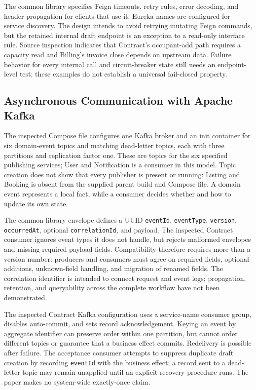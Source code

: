 The common library specifies Feign timeouts, retry rules, error decoding, and header propagation for clients that use it. Eureka names are configured for service discovery. The design intends to avoid retrying mutating Feign commands, but the retained internal draft endpoint is an exception to a read-only interface rule. Source inspection indicates that Contract's occupant-add path requires a capacity read and Billing's invoice close depends on upstream data. Failure behavior for every internal call and circuit-breaker state still needs an endpoint-level test; these examples do not establish a universal fail-closed property.

\subsection{Asynchronous Communication with Apache Kafka}
The inspected Compose file configures one Kafka broker and an init container for six domain-event topics and matching dead-letter topics, each with three partitions and replication factor one. These are topics for the six specified publishing services; User and Notification is a consumer in this model. Topic creation does not show that every publisher is present or running: Listing and Booking is absent from the supplied parent build and Compose file. A domain event represents a local fact, while a consumer decides whether and how to update its own state.

The common-library envelope defines a UUID \texttt{eventId}, \texttt{eventType}, \texttt{version}, \texttt{occurredAt}, optional \texttt{correlationId}, and payload. The inspected Contract consumer ignores event types it does not handle, but rejects malformed envelopes and missing required payload fields. Compatibility therefore requires more than a version number: producers and consumers must agree on required fields, optional additions, unknown-field handling, and migration of renamed fields. The correlation identifier is intended to connect request and event logs; propagation, retention, and queryability across the complete workflow have not been demonstrated.

The inspected Contract Kafka configuration uses a service-name consumer group, disables auto-commit, and sets record acknowledgement. Keying an event by aggregate identifier can preserve order within one partition, but cannot order different topics or guarantee that a business effect commits. Redelivery is possible after failure. The acceptance consumer attempts to suppress duplicate draft creation by recording \texttt{eventId} with the business effect; a record sent to a dead-letter topic may remain unapplied until an explicit recovery procedure runs. The paper makes no system-wide exactly-once claim.

